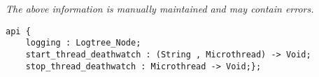 \label{api:Thread\_Deathwatch}

{\tiny \it The above information is manually maintained and may contain errors.}
\begin{verbatim}
api {
    logging : Logtree_Node;
    start_thread_deathwatch : (String , Microthread) -> Void;
    stop_thread_deathwatch : Microthread -> Void;};
\end{verbatim}
